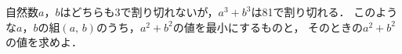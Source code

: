 \documentclass[../../main.tex]{subfiles}
\begin{document}
自然数$a$，$b$はどちらも3で割り切れないが，$a^3+b^3$は81で割り切れる．
このような$a$，$b$の組$(a, \, b)$のうち，$a^2+b^2$の値を最小にするものと，
そのときの$a^2+b^2$の値を求めよ．
\end{document}

